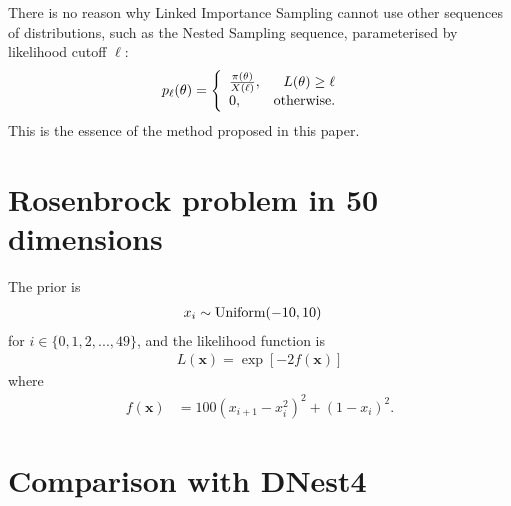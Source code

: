 \documentclass[a4paper, 12pt]{article}
\begin{document}
There is no reason why Linked Importance Sampling cannot use other sequences
of distributions, such as the Nested Sampling sequence, parameterised by
likelihood cutoff $\ell$:
\begin{align}
p_{\ell}(\theta) &= \left\{
                     \begin{array}{lr}
                       \frac{\pi(\theta)}{X(\ell)}, & L(\theta) \geq \ell \\
                       0, &\textnormal{otherwise}.
                     \end{array}\right.
\end{align}
This is the essence of the method proposed in this paper.




\section{Rosenbrock problem in 50 dimensions}

The prior is
\begin{align}
x_i &\sim \textnormal{Uniform}(-10, 10)
\end{align}
for $i \in \{0, 1, 2, ..., 49\}$,
and the likelihood function is
\begin{align}
L(\boldsymbol{x}) = \exp\left[-2f(\boldsymbol{x})\right]
\end{align}
where
\begin{align}
f(\boldsymbol{x}) &= 100(x_{i+1} - x_{i}^2)^2 + (1-x_i)^2.
\end{align}




\section{Comparison with DNest4}
\end{document}
